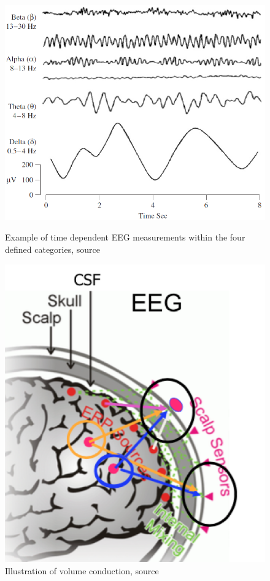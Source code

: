 \begin{figure}[htb]
    \begin{minipage}[t]{.45\textwidth}
        \centering
        \includegraphics[width=\textwidth]{figurs/EEG_example.png}
        \caption{Example of time dependent EEG measurements within the four defined categories, source \cite{EEGsignalprocessing}}\label{fig:EEG_example}
    \end{minipage}
    \hfill
    \begin{minipage}[t]{.45\textwidth}
        \centering
        \includegraphics[width=\textwidth]{figurs/scalp.png}
        \caption{Illustration of volume conduction, source \cite{phd2015}}\label{fig:volumeconduction}
    \end{minipage}  

\end{figure}

